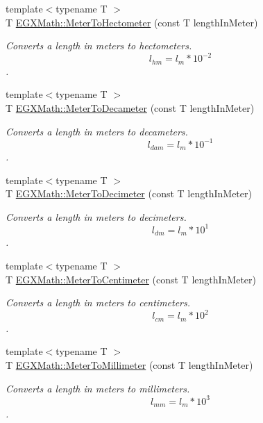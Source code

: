 \begin{DoxyCompactItemize}
{\footnotesize template$<$typename T $>$ }\\T \mbox{\hyperlink{group___e_g_x_math-_conversions-_length_conversions-_s_i-_meter-_s_i_ga1de9cc8f2ecedbf82eacc869b0c0569c}{E\+G\+X\+Math\+::\+Meter\+To\+Hectometer}} (const T length\+In\+Meter)
\begin{DoxyCompactList}\small\item\em Converts a length in meters to hectometers. \[ l_{hm}=l_{m} * 10^{-2} \]. \end{DoxyCompactList}\item 
{\footnotesize template$<$typename T $>$ }\\T \mbox{\hyperlink{group___e_g_x_math-_conversions-_length_conversions-_s_i-_meter-_s_i_ga1b18e63d03025512566c5f55ad4e0c89}{E\+G\+X\+Math\+::\+Meter\+To\+Decameter}} (const T length\+In\+Meter)
\begin{DoxyCompactList}\small\item\em Converts a length in meters to decameters. \[ l_{dam}=l_{m} * 10^{-1} \]. \end{DoxyCompactList}\item 
{\footnotesize template$<$typename T $>$ }\\T \mbox{\hyperlink{group___e_g_x_math-_conversions-_length_conversions-_s_i-_meter-_s_i_ga4caa9cd21d4f78039b1ceddf1f0ea5fd}{E\+G\+X\+Math\+::\+Meter\+To\+Decimeter}} (const T length\+In\+Meter)
\begin{DoxyCompactList}\small\item\em Converts a length in meters to decimeters. \[ l_{dm}=l_{m} * 10^{1} \]. \end{DoxyCompactList}\item 
{\footnotesize template$<$typename T $>$ }\\T \mbox{\hyperlink{group___e_g_x_math-_conversions-_length_conversions-_s_i-_meter-_s_i_gab70c34d0ee4bf48225d48e48b28f808a}{E\+G\+X\+Math\+::\+Meter\+To\+Centimeter}} (const T length\+In\+Meter)
\begin{DoxyCompactList}\small\item\em Converts a length in meters to centimeters. \[ l_{cm}=l_{m} * 10^{2} \]. \end{DoxyCompactList}\item 
{\footnotesize template$<$typename T $>$ }\\T \mbox{\hyperlink{group___e_g_x_math-_conversions-_length_conversions-_s_i-_meter-_s_i_ga9bd519d9f6b1a52f85e7817f4f81690b}{E\+G\+X\+Math\+::\+Meter\+To\+Millimeter}} (const T length\+In\+Meter)
\begin{DoxyCompactList}\small\item\em Converts a length in meters to millimeters. \[ l_{mm}=l_{m} * 10^{3} \]. \end{DoxyCompactList}\item 

\end{DoxyCompactItemize}
